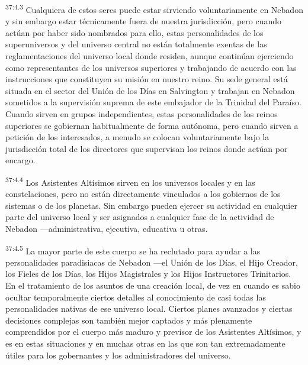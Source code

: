 \par
\textsuperscript{37:4.3} Cualquiera de estos seres puede estar sirviendo voluntariamente en Nebadon y sin embargo estar técnicamente fuera de nuestra jurisdicción, pero cuando actúan por haber sido nombrados para ello, estas personalidades de los superuniversos y del universo central no están totalmente exentas de las reglamentaciones del universo local donde residen, aunque continúan ejerciendo como representantes de los universos superiores y trabajando de acuerdo con las instrucciones que constituyen su misión en nuestro reino. Su sede general está situada en el sector del Unión de los Días en Salvington y trabajan en Nebadon sometidos a la supervisión suprema de este embajador de la Trinidad del Paraíso. Cuando sirven en grupos independientes, estas personalidades de los reinos superiores se gobiernan habitualmente de forma autónoma, pero cuando sirven a petición de los interesados, a menudo se colocan voluntariamente bajo la jurisdicción total de los directores que supervisan los reinos donde actúan por encargo.

\par
\textsuperscript{37:4.4} Los Asistentes Altísimos sirven en los universos locales y en las constelaciones, pero no están directamente vinculados a los gobiernos de los sistemas o de los planetas. Sin embargo pueden ejercer su actividad en cualquier parte del universo local y ser asignados a cualquier fase de la actividad de Nebadon ---administrativa, ejecutiva, educativa u otras.

\par
\textsuperscript{37:4.5} La mayor parte de este cuerpo se ha reclutado para ayudar a las personalidades paradisiacas de Nebadon ---el Unión de los Días, el Hijo Creador, los Fieles de los Días, los Hijos Magistrales y los Hijos Instructores Trinitarios. En el tratamiento de los asuntos de una creación local, de vez en cuando es sabio ocultar temporalmente ciertos detalles al conocimiento de casi todas las personalidades nativas de ese universo local. Ciertos planes avanzados y ciertas decisiones complejas son también mejor captados y más plenamente comprendidos por el cuerpo más maduro y previsor de los Asistentes Altísimos, y es en estas situaciones y en muchas otras en las que son tan extremadamente útiles para los gobernantes y los administradores del universo.

